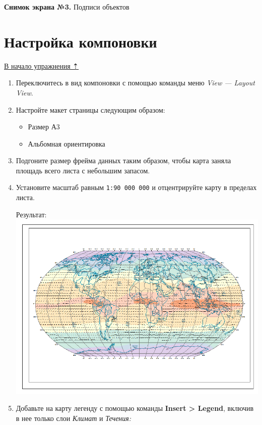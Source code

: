 \documentclass[12pt,]{book}
\providecommand{\tightlist}{%
  \setlength{\itemsep}{0pt}\setlength{\parskip}{0pt}}
\begin{document}
\textbf{Снимок экрана №3.} Подписи объектов

\hypertarget{map-design-climates-layout}{%
\section{Настройка компоновки}\label{map-design-climates-layout}}

\protect\hyperlink{map-design-climates}{В начало упражнения ⇡}

\begin{enumerate}
\def\labelenumi{\arabic{enumi}.}
\item
  Переключитесь в вид компоновки с помощью команды меню \emph{View --- Layout View}.
\item
  Настройте макет страницы следующим образом:

  \begin{itemize}
  \tightlist
  \item
    Размер А3
  \item
    Альбомная ориентировка
  \end{itemize}
\item
  Подгоните размер фрейма данных таким образом, чтобы карта заняла площадь всего листа с небольшим запасом.
\item
  Установите масштаб равным \texttt{1:90\ 000\ 000} и отцентрируйте карту в пределах листа.

  Результат:
  \includegraphics{images/Ex03/image30.png}
\item
  Добавьте на карту легенду с помощью команды \textbf{Insert \textgreater{} Legend}, включив в нее только слои \emph{Климат} и \emph{Течения:}


\end{enumerate}
\end{document}
